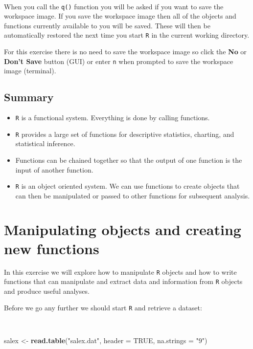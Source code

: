 \documentclass[12pt,a4paper]{book}
\newenvironment{Shaded}{\begin{snugshade}}{\end{snugshade}}
\newcommand{\KeywordTok}[1]{\textcolor[rgb]{0.13,0.29,0.53}{\textbf{#1}}}
\newcommand{\DataTypeTok}[1]{\textcolor[rgb]{0.13,0.29,0.53}{#1}}
\newcommand{\StringTok}[1]{\textcolor[rgb]{0.31,0.60,0.02}{#1}}
\newcommand{\OtherTok}[1]{\textcolor[rgb]{0.56,0.35,0.01}{#1}}
\newcommand{\NormalTok}[1]{#1}
\providecommand{\tightlist}{%
  \setlength{\itemsep}{0pt}\setlength{\parskip}{0pt}}
\theoremstyle{definition}
\theoremstyle{definition}
\theoremstyle{definition}
\theoremstyle{remark}
\begin{document}
~

When you call the \texttt{q()} function you will be asked if you want to
save the workspace image. If you save the workspace image then all of
the objects and functions currently available to you will be saved.
These will then be automatically restored the next time you start
\texttt{R} in the current working directory.

For this exercise there is no need to save the workspace image so click
the \textbf{No} or \textbf{Don't Save} button (GUI) or enter \texttt{n}
when prompted to save the workspace image (terminal).

\hypertarget{summary}{%
\section{Summary}\label{summary}}

\begin{itemize}
\tightlist
\item
  \texttt{R} is a functional system. Everything is done by calling
  functions.
\item
  \texttt{R} provides a large set of functions for descriptive
  statistics, charting, and statistical inference.
\item
  Functions can be chained together so that the output of one function
  is the input of another function.
\item
  \texttt{R} is an object oriented system. We can use functions to
  create objects that can then be manipulated or passed to other
  functions for subsequent analysis.
\end{itemize}

\hypertarget{exercise2}{%
\chapter{Manipulating objects and creating new
functions}\label{exercise2}}

In this exercise we will explore how to manipulate \texttt{R} objects
and how to write functions that can manipulate and extract data and
information from \texttt{R} objects and produce useful analyses.

Before we go any further we should start \texttt{R} and retrieve a
dataset:

~

\begin{Shaded}
\begin{Highlighting}[]
\NormalTok{salex <-}\StringTok{ }\KeywordTok{read.table}\NormalTok{(}\StringTok{"salex.dat"}\NormalTok{, }\DataTypeTok{header =} \OtherTok{TRUE}\NormalTok{, }\DataTypeTok{na.strings =} \StringTok{"9"}\NormalTok{)}
\end{Highlighting}
\end{Shaded}
\end{document}
